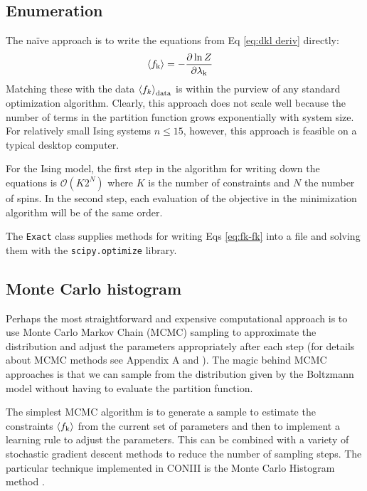 \documentclass[aps,prl,twocolumn]{revtex4-1}
\begin{document}
\subsection{Enumeration}
The na\"{i}ve approach is to write the equations from Eq \ref{eq:dkl deriv} directly:
\begin{align}
	\left<f_{\rm k}\right> &= -\frac{\partial \ln Z}{\partial \lambda_{\rm k}}
\end{align}
Matching these with the data $\left<f_k\right>_{\rm data}$ is within the purview of any standard optimization algorithm. Clearly, this approach does not scale well because the number of terms in the partition function grows exponentially with system size. For relatively small Ising systems $n\leq15$, however, this approach is feasible on a typical desktop computer.

For the Ising model, the first step in the algorithm for writing down the equations is $\mathcal{O}(K 2^{N})$ where $K$ is the number of constraints and $N$ the number of spins. In the second step, each evaluation of the objective in the minimization algorithm will be of the same order.

The {\tt Exact} class supplies methods for writing Eqs \ref{eq:fk-fk} into a file and solving them with the {\tt scipy.optimize} library.


\subsection{Monte Carlo histogram}
Perhaps the most straightforward and expensive computational approach is to use Monte Carlo Markov Chain (MCMC) sampling to approximate the distribution and adjust the parameters appropriately after each step (for details about MCMC methods see Appendix A and \cite{MacKay:2005wc}). The magic behind MCMC approaches is that we can sample from the distribution given by the Boltzmann model without having to evaluate the partition function.

The simplest MCMC algorithm is to generate a sample to estimate the constraints $\left<f_{\rm k}\right>$ from the current set of parameters and then to implement a learning rule to adjust the parameters. This can be combined with a variety of stochastic gradient descent methods to reduce the number of sampling steps. The particular technique implemented in CONIII is the Monte Carlo Histogram method \cite{Broderick:2007wq}.
\end{document}
